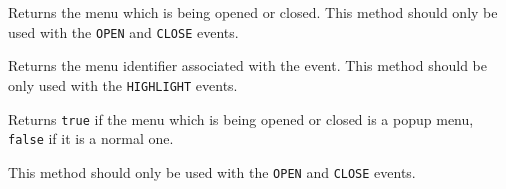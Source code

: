 
Returns the menu which is being opened or closed. This method should only be
used with the \texttt{OPEN} and \texttt{CLOSE} events.


\label{wxmenueventgetmenuid}


Returns the menu identifier associated with the event. This method should be
only used with the {\tt HIGHLIGHT} events.


\label{wxmenueventispopup}


Returns {\tt true} if the menu which is being opened or closed is a popup menu, 
{\tt false} if it is a normal one.

This method should only be used with the {\tt OPEN} and {\tt CLOSE} events.


